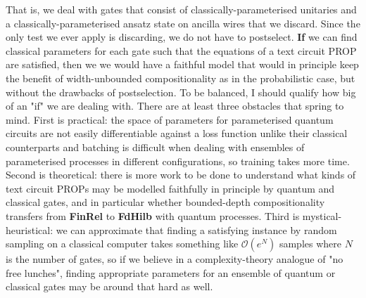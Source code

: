 That is, we deal with gates that consist of classically-parameterised unitaries and a classically-parameterised ansatz state on ancilla wires that we discard. Since the only test we ever apply is discarding, we do not have to postselect. \textbf{If} we can find classical parameters for each gate such that the equations of a text circuit PROP are satisfied, then we we would have a faithful model that would in principle keep the benefit of width-unbounded compositionality as in the probabilistic case, but without the drawbacks of postselection. To be balanced, I should qualify how big of an "if" we are dealing with. There are at least three obstacles that spring to mind. First is practical: the space of parameters for parameterised quantum circuits are not easily differentiable against a loss function unlike their classical counterparts and batching is difficult when dealing with ensembles of parameterised processes in different configurations, so training takes more time. Second is theoretical: there is more work to be done to understand what kinds of text circuit PROPs may be modelled faithfully in principle by quantum and classical gates, and in particular whether bounded-depth compositionality transfers from \textbf{FinRel} to \textbf{FdHilb} with quantum processes. Third is mystical-heuristical: we can approximate that finding a satisfying instance by random sampling on a classical computer takes something like $\mathcal{O}(e^N)$ samples where $N$ is the number of gates, so if we believe in a complexity-theory analogue of "no free lunches", finding appropriate parameters for an ensemble of quantum or classical gates may be around that hard as well.